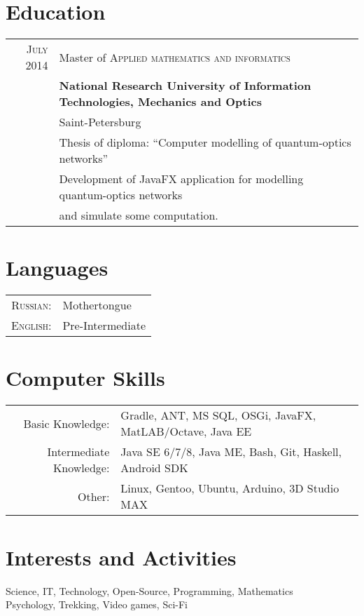 \documentclass[a4paper,10pt]{article}
\begin{document}
		\section{Education}
		\begin{tabular}{rl}	
		\textsc{July} 2014 & Master of \textsc{Applied mathematics and informatics} \\& \textbf{National Research University of Information Technologies, Mechanics and Optics}\\& Saint-Petersburg\\
			& Thesis of diploma: ``Computer modelling of quantum-optics networks''\\&
			Development of JavaFX application for modelling quantum-optics networks \\&and simulate some computation.
			\end{tabular}

			\section{Languages}
			\begin{tabular}{rl}
			\textsc{Russian:}&Mothertongue\\
				\textsc{English:}&Pre-Intermediate\\
				\end{tabular}

				\section{Computer Skills}
				\begin{tabular}{rl}
				Basic Knowledge:& Gradle, ANT, MS SQL, OSGi, JavaFX, MatLAB/Octave, Java EE \\
					Intermediate Knowledge:& Java SE 6/7/8, Java ME, Bash, Git, Haskell, Android SDK \\
					Other:& Linux, Gentoo, Ubuntu, Arduino, 3D Studio MAX
					\end{tabular}

					\section{Interests and Activities}
					Science, IT, Technology, Open-Source, Programming, Mathematics \\
						Psychology, Trekking, Video games, Sci-Fi 
\end{document}
